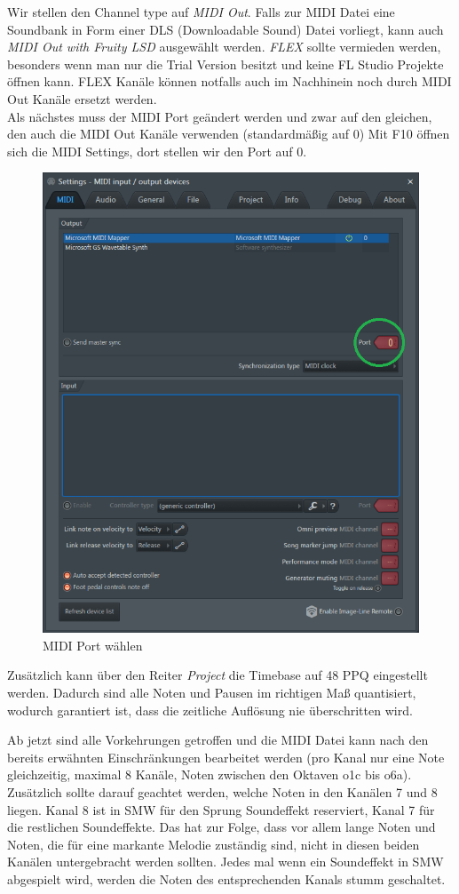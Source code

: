 Wir stellen den Channel type auf \textit{MIDI Out}. Falls zur MIDI Datei eine Soundbank in Form einer DLS (Downloadable Sound) Datei vorliegt, kann auch \textit{MIDI Out with Fruity LSD} ausgewählt werden. \textit{FLEX} sollte vermieden werden, besonders wenn man nur die Trial Version besitzt und keine FL Studio Projekte öffnen kann. FLEX Kanäle können notfalls auch im Nachhinein noch durch MIDI Out Kanäle ersetzt werden. \\
Als nächstes muss der MIDI Port geändert werden und zwar auf den gleichen, den auch die MIDI Out Kanäle verwenden (standardmäßig auf 0) Mit F10 öffnen sich die MIDI Settings, dort stellen wir den Port auf 0.

\bigskip

\begin{figure}[htbp] \centering
	\includegraphics[width=.63\linewidth]{images/MIDIPort.png}
	\caption{MIDI Port wählen}
	\label{MIDIPort}
\end{figure}

Zusätzlich kann über den Reiter \textit{Project} die Timebase auf 48 PPQ eingestellt werden. Dadurch sind alle Noten und Pausen im richtigen Maß quantisiert, wodurch garantiert ist, dass die zeitliche Auflösung nie überschritten wird.

\bigskip

Ab jetzt sind alle Vorkehrungen getroffen und die MIDI Datei kann nach den bereits erwähnten Einschränkungen bearbeitet werden (pro Kanal nur eine Note gleichzeitig, maximal 8 Kanäle, Noten zwischen den Oktaven o1c bis o6a).
Zusätzlich sollte darauf geachtet werden, welche Noten in den Kanälen 7 und 8 liegen. Kanal 8 ist in SMW für den Sprung Soundeffekt reserviert, Kanal 7 für die restlichen Soundeffekte. Das hat zur Folge, dass vor allem lange Noten und Noten, die für eine markante Melodie zuständig sind, nicht in diesen beiden Kanälen untergebracht werden sollten. Jedes mal wenn ein Soundeffekt in SMW abgespielt wird, werden die Noten des entsprechenden Kanals stumm geschaltet.

